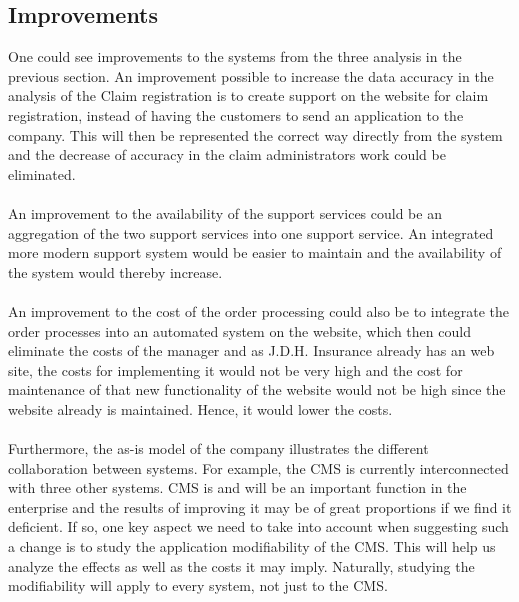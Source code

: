 \subsection{Improvements}
\label{sec:improvements}
One could see improvements to the systems from the three analysis in the previous section. An improvement possible to increase the data accuracy in the analysis of the Claim registration is to create support on the website for claim registration, instead of having the customers to send an application to the company. This will then be represented the correct way directly from the system and the decrease of accuracy in the claim administrators work could be eliminated.\\\\
%
An improvement to the availability of the support services could be an aggregation of the two support services into one support service. An integrated more modern support system would be easier to maintain and the availability of the system would thereby increase.\\\\
%
An improvement to the cost of the order processing could also be to integrate the order processes into an automated system on the website, which then could eliminate the costs of the manager and as J.D.H. Insurance already has an web site, the costs for implementing it would not be very high and the cost for maintenance of that new functionality of the website would not be high since the website already is maintained. Hence, it would lower the costs.\\\\
%
Furthermore, the as-is model of the company illustrates the different collaboration between systems. For example, the CMS is currently interconnected with three other systems. CMS is and will be an important function in the enterprise and the results of improving it may be of great proportions if we find it deficient. If so, one key aspect we need to take into account when suggesting such a change is to study the application modifiability of the CMS. This will help us analyze the effects as well as the costs it may imply. Naturally, studying the modifiability will apply to every system, not just to the CMS.
